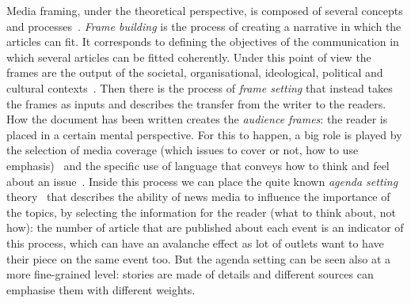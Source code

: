 Media framing, under the theoretical perspective, is composed of several concepts and processes~\cite{scheufele2007framing}.
\textit{Frame building} is the process of creating a narrative in which the articles can fit. It corresponds to defining the objectives of the communication in which several articles can be fitted coherently. Under this point of view the frames are the output of the societal, organisational, ideological, political and cultural contexts~\cite{scheufele1999framing}.
Then there is the process of \textit{frame setting} that instead takes the frames as inputs and describes the transfer from the writer to the readers. How the document has been written creates the \emph{audience frames}: the reader is placed in a certain mental perspective. For this to happen, a big role is played by the selection of media coverage (which issues to cover or not, how to use emphasis)~\cite{iyengar1994anyone} and the specific use of language that conveys how to think and feel about an issue~\cite{bryant2012fundamentals}.
Inside this process we can place the quite known \emph{agenda setting} theory~\cite{mccombs1972agenda} that describes the ability of news media to influence the importance of the topics, by selecting the information for the reader (what to think about, not how): %
the number of article that are published about each event is an indicator of this process, which can have an avalanche effect as lot of outlets want to have their piece on the same event too.
But the agenda setting can be seen also at a more fine-grained level: stories are made of details and different sources can emphasise them with different weights.


